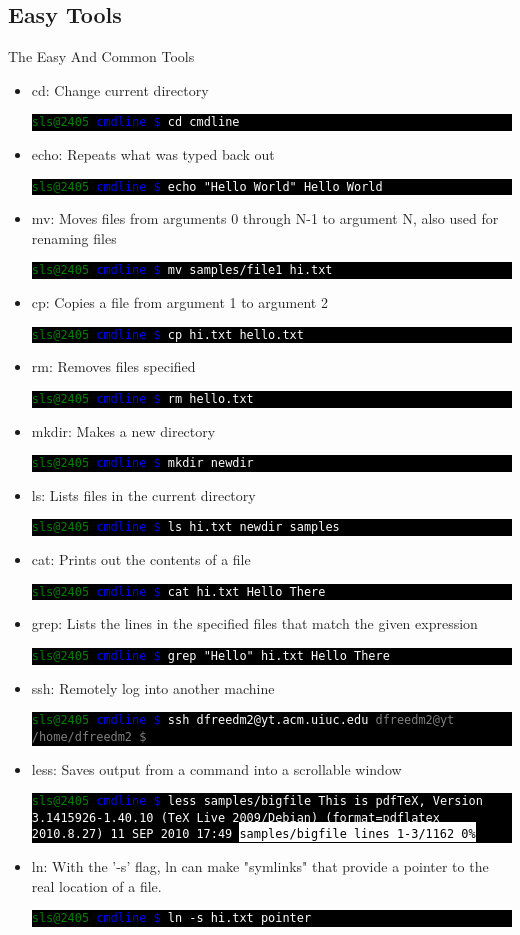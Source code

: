 \documentclass[10pt]{beamer}
\makeatletter
\newcommand{\codeblock}[1]
{
  \colorbox{black}{
    \begin{minipage}{\linewidth}
      \texttt{\textcolor{green}{sls@2405} \textcolor{blue}{cmdline \$} \textcolor{white}{#1}}
    \end{minipage}
  }
}
\newcommand{\codeblockWO}[2]
{
  \colorbox{black}{
    \begin{minipage}{\linewidth}
      \texttt{\textcolor{green}{sls@2405} \textcolor{blue}{cmdline \$} \textcolor{white}{#1}
      \newline
      \textcolor{white}{#2}}
    \end{minipage}
  }
}
\makeatother
\begin{document}
\subsection{Easy Tools}
\begin{frame}[allowframebreaks]{The Easy And Common Tools}
\begin{itemize}
\item cd: Change current directory
\codeblock{cd cmdline}

\item echo: Repeats what was typed back out
\codeblockWO{echo "Hello World"}{Hello World}

\item mv: Moves files from arguments 0 through N-1 to argument N, also used for renaming files
\codeblock{mv samples/file1 hi.txt}

\item cp: Copies a file from argument 1 to argument 2
\codeblock{cp hi.txt hello.txt}

\item rm: Removes files specified
\codeblock{rm hello.txt}

\item mkdir: Makes a new directory
\codeblock{mkdir newdir}

\item ls: Lists files in the current directory
\codeblockWO{ls}{hi.txt\newline~newdir\newline~samples}

\item cat: Prints out the contents of a file
\codeblockWO{cat hi.txt}{Hello There}

\item grep: Lists the lines in the specified files that match the given expression
\codeblockWO{grep "Hello" hi.txt}{Hello There}

\item ssh: Remotely log into another machine
\codeblockWO{ssh dfreedm2@yt.acm.uiuc.edu}{\textcolor{gray}{dfreedm2@yt /home/dfreedm2 \$}}

\item less: Saves output from a command into a scrollable window
\codeblockWO{less samples/bigfile}{This is pdfTeX, Version 3.1415926-1.40.10 (TeX Live 2009/Debian) (format=pdflatex 2010.8.27)  11 SEP 2010 17:49\newline~\colorbox{white}{\textcolor{black}{samples/bigfile lines 1-3/1162 0\%}}}

\item ln: With the '-s' flag, ln can make "symlinks" that provide a pointer to the real location of a file.
\codeblock{ln -s hi.txt pointer}


\end{itemize}
\end{frame}
\end{document}

